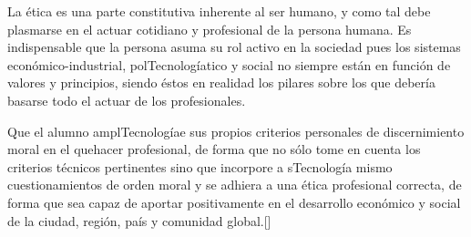 \begin{syllabus}


\begin{justification}
La ética es una parte constitutiva inherente al ser humano, y como tal debe plasmarse en el actuar cotidiano y profesional de la persona humana. Es indispensable que la persona asuma su rol activo en la sociedad pues los sistemas económico-industrial, polTecnologíatico y social no siempre están en función de valores y principios, siendo éstos en realidad los pilares sobre los que debería basarse todo el actuar de los profesionales.
\end{justification}

\begin{goals}
\item Que el alumno amplTecnologíae sus propios criterios personales de discernimiento moral en el quehacer profesional, de forma que no sólo tome en cuenta los criterios técnicos pertinentes sino que incorpore a sTecnología mismo cuestionamientos de orden moral y se adhiera a una ética profesional correcta, de forma que sea capaz de aportar positivamente en el desarrollo económico y social de la ciudad, región, país y comunidad global.[\Usage]
\end{goals}

\begin{outcomes}
    \item {}
    \item {}
	\item {}
\end{outcomes}

\begin{competences}
    \item {}
    \item {}
    \item {}
    \item {}
\end{competences}


\end{syllabus}

